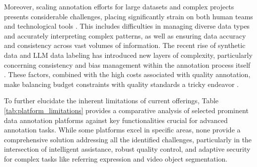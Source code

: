 Moreover, scaling annotation efforts for large datasets and complex projects presents considerable challenges, placing significantly strain on both human teams and technological tools \cite{garcia2021scalability}. This includes difficulties in managing diverse data types and accurately interpreting complex patterns, as well as ensuring data accuracy and consistency across vast volumes of information. The recent rise of synthetic data and LLM data labeling has introduced new layers of complexity, particularly concerning consistency and bias management within the annotation process itself \cite{brown2023synthetic}. These factors, combined with the high costs associated with quality annotation, make balancing budget constraints with quality standards a tricky endeavor \cite{miller2024cost}.

To further elucidate the inherent limitations of current offerings, Table \ref{tab:platform_limitations} provides a comparative analysis of selected prominent data annotation platforms against key functionalities crucial for advanced annotation tasks. While some platforms excel in specific areas, none provide a comprehensive solution addressing all the identified challenges, particularly in the intersection of intelligent assistance, robust quality control, and adaptive security for complex tasks like referring expression and video object segmentation.

